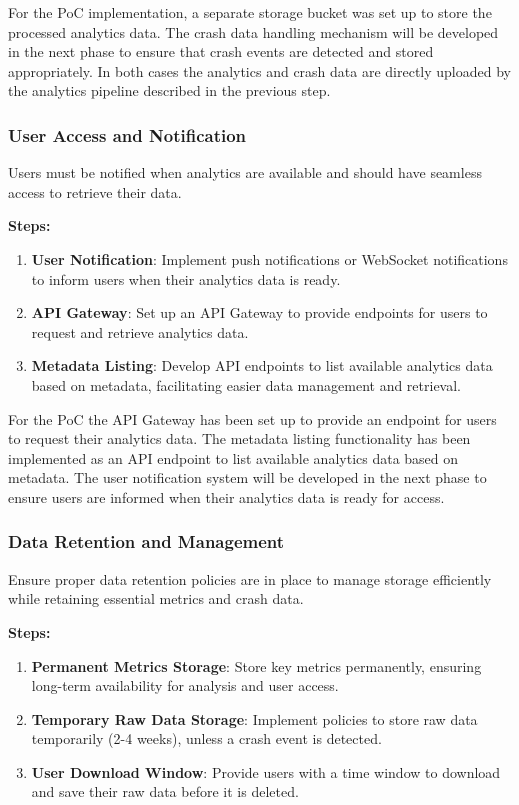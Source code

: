 For the PoC implementation, a separate storage bucket was set up to store the processed analytics data. The crash data handling mechanism will be developed in the next phase to ensure that crash events are detected and stored appropriately.
In both cases the analytics and crash data are directly uploaded by the analytics pipeline described in the previous step.

\subsubsection{User Access and Notification}
Users must be notified when analytics are available and should have seamless access to retrieve their data.

\textbf{Steps:}
\begin{enumerate}
    \item \textbf{User Notification}: Implement push notifications or WebSocket notifications to inform users when their analytics data is ready.
    \item \textbf{API Gateway}: Set up an API Gateway to provide endpoints for users to request and retrieve analytics data.
    \item \textbf{Metadata Listing}: Develop API endpoints to list available analytics data based on metadata, facilitating easier data management and retrieval.
\end{enumerate}

For the PoC the API Gateway has been set up to provide an endpoint for users to request their analytics data. The metadata listing functionality has been implemented as an API endpoint to list available analytics data based on metadata. The user notification system will be developed in the next phase to ensure users are informed when their analytics data is ready for access.

\subsubsection{Data Retention and Management}
Ensure proper data retention policies are in place to manage storage efficiently while retaining essential metrics and crash data.

\textbf{Steps:}
\begin{enumerate}
    \item \textbf{Permanent Metrics Storage}: Store key metrics permanently, ensuring long-term availability for analysis and user access.
    \item \textbf{Temporary Raw Data Storage}: Implement policies to store raw data temporarily (2-4 weeks), unless a crash event is detected.
    \item \textbf{User Download Window}: Provide users with a time window to download and save their raw data before it is deleted.
\end{enumerate}

